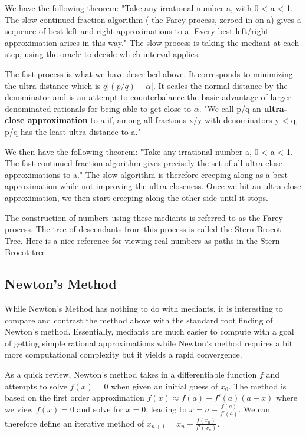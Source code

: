 \documentclass[12pt]{article}
\theoremstyle{remark}
\begin{document}
We have the following theorem: "Take any irrational number a, with 0 < a < 1. The slow continued fraction algorithm ( the Farey process, zeroed in on a) gives a sequence of best left and right approximations to a. Every best left/right approximation arises in this way." The slow process is taking the mediant at each step, using the oracle to decide which interval applies. 

The fast process is what we have described above. It corresponds to minimizing the ultra-distance which is $q|(p/q)-\alpha|$. It scales the normal distance by the denominator and is an attempt to counterbalance the basic advantage of larger denominated rationals for being able to get close to $\alpha$.  "We call p/q an \textbf{ultra-close approximation} to a if, among all fractions x/y with denominators y < q, p/q has the least ultra-distance to a."

We then have the following theorem: "Take any irrational number a, 0 < a < 1. The fast continued fraction algorithm gives precisely the set of all ultra-close approximations to a."  The slow algorithm is therefore creeping along as a best approximation while not improving the ultra-closeness. Once we hit an ultra-close approximation, we then start creeping along the other side until it stops. 

The construction of numbers using these mediants is referred to as the Farey process. The tree of descendants from this process is called the Stern-Brocot Tree. Here is a nice reference for viewing \href{https://mattbaker.blog/2019/01/28/the-stern-brocot-tree-hurwitzs-theorem-and-the-markoff-uniqueness-conjecture/}{real numbers as paths in the Stern-Brocot tree}.


\subsection{Newton's Method}

While Newton's Method has nothing to do with mediants, it is interesting to compare and contrast the method above with the standard root finding of Newton's method. Essentially, mediants are much easier to compute with a goal of getting simple rational approximations while Newton's method requires a bit more computational complexity but it yields a rapid convergence. 

As a quick review, Newton's method takes in a differentiable function $f$ and attempts to solve $f(x)= 0$ when given an initial guess of $x_0$. The method is based on the first order approximation $f(x) \approx f(a) + f'(a) (a-x) $ where we view $f(x) =0$ and solve for $x =0$, leading to $x = a - \tfrac{f(a)}{f'(a)}$. We can therefore define an iterative method of $x_{n+1} = x_n - \tfrac{f(x_n)}{f'(x_n)}$.
\end{document}
